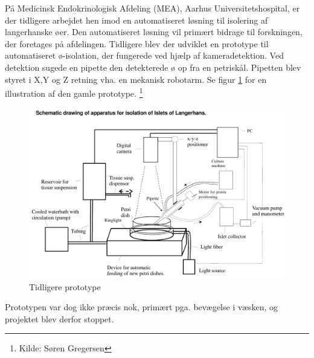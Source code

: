 \newpage
På Medicinsk Endokrinologisk Afdeling (MEA), Aarhus Universitetshospital, er der tidligere arbejdet hen imod en automatiseret løsning til isolering af langerhanske øer. Den automatiseret løsning vil primært bidrage til forskningen, der foretages på afdelingen. Tidligere blev der udviklet en prototype til automatiseret ø-isolation, der fungerede ved hjælp af kameradetektion. Ved detektion sugede en pipette den detekterede ø op fra en petriskål. Pipetten blev styret i X,Y og Z retning vha. en mekanisk robotarm. Se figur \ref{fig:Tidliger prototype} for en illustration af den gamle prototype. \footnote{Kilde: Søren Gregersen}

\begin{figure}[H]
	\centering
	\includegraphics[width=1\textwidth]{billeder/hovedrapport/glprototype.pdf}
	\caption{Tidligere prototype}
	\label{fig:Tidliger prototype}
\end{figure}


 Prototypen var dog ikke præcis nok, primært pga. bevægelse i væsken, og projektet blev derfor stoppet.
 

%
%
%
% 
% 
% 
% 
% 

